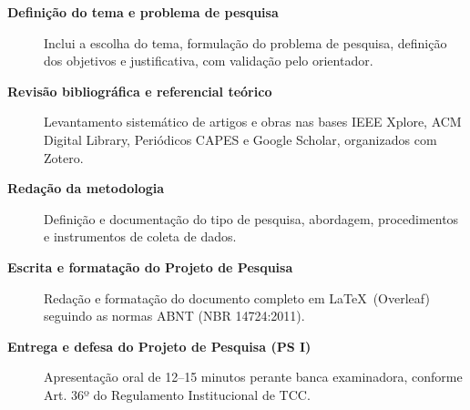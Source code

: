 \begin{description}

  \item[\textbf{Definição do tema e problema de pesquisa}]
    Inclui a escolha do tema, formulação do problema de pesquisa,
    definição dos objetivos e justificativa, com validação pelo orientador.

  \item[\textbf{Revisão bibliográfica e referencial teórico}]
    Levantamento sistemático de artigos e obras nas bases IEEE Xplore,
    ACM Digital Library, Periódicos CAPES e Google Scholar,
    organizados com Zotero.

  \item[\textbf{Redação da metodologia}]
    Definição e documentação do tipo de pesquisa, abordagem,
    procedimentos e instrumentos de coleta de dados.

  \item[\textbf{Escrita e formatação do Projeto de Pesquisa}]
    Redação e formatação do documento completo em \LaTeX\ (Overleaf)
    seguindo as normas ABNT (NBR 14724:2011).

  \item[\textbf{Entrega e defesa do Projeto de Pesquisa (PS I)}]
    Apresentação oral de 12--15 minutos perante banca examinadora,
    conforme Art. 36º do Regulamento Institucional de TCC.


\end{description}
